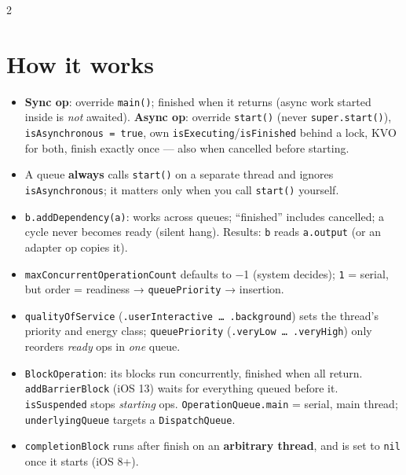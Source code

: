 \documentclass[8pt]{extarticle}
\begin{document}
\begin{multicols}{2}
\raggedright

\section{How it works}
\begin{itemize}
  \item \textbf{Sync op}: override \texttt{main()}; finished when it returns (async work
        started inside is \emph{not} awaited). \textbf{Async op}: override
        \texttt{start()} (never \texttt{super.start()}), \texttt{isAsynchronous = true},
        own \texttt{isExecuting}/\texttt{isFinished} behind a lock, KVO for both, finish
        exactly once — also when cancelled before starting.
  \item A queue \textbf{always} calls \texttt{start()} on a separate thread and ignores
        \texttt{isAsynchronous}; it matters only when you call \texttt{start()} yourself.
  \item \texttt{b.addDependency(a)}: works across queues; ``finished'' includes cancelled; a
        cycle never becomes ready (silent hang). Results: \texttt{b} reads
        \texttt{a.output} (or an adapter op copies it).
  \item \texttt{maxConcurrentOperationCount} defaults to −1 (system decides);
        \texttt{1} = serial, but order = readiness → \texttt{queuePriority} → insertion.
  \item \texttt{qualityOfService} (\texttt{.userInteractive … .background}) sets the
        thread's priority and energy class; \texttt{queuePriority}
        (\texttt{.veryLow … .veryHigh}) only reorders \emph{ready} ops in \emph{one} queue.
  \item \texttt{BlockOperation}: its blocks run concurrently, finished when all return.
        \texttt{addBarrierBlock} (iOS 13) waits for everything queued before it.
        \texttt{isSuspended} stops \emph{starting} ops. \texttt{OperationQueue.main} =
        serial, main thread; \texttt{underlyingQueue} targets a \texttt{DispatchQueue}.
  \item \texttt{completionBlock} runs after finish on an \textbf{arbitrary thread}, and is
        set to \texttt{nil} once it starts (iOS 8+).
\end{itemize}


\end{multicols}
\end{document}
